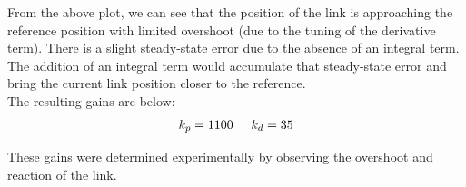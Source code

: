 \documentclass[10pt]{article}
\begin{document}
\begin{enumerate}
	From the above plot, we can see that the position of the link is approaching the reference position with limited overshoot (due to the tuning of the derivative term). There is a slight steady-state error due to the absence of an integral term. The addition of an integral term would accumulate that steady-state error and bring the current link position closer to the reference. 
	\\
	
	The resulting gains are below:
	\begin{align*}
		k_p = 1100 \hspace{0.5cm} k_d = 35
	\end{align*}
	
	These gains were determined experimentally by observing the overshoot and reaction of the link.

\end{enumerate}
\end{document}
